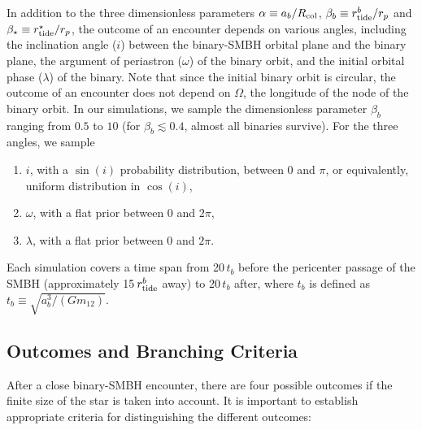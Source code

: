 \documentclass[twocolumn]{aastex631}
\begin{document}
In addition to the three dimensionless parameters $\alpha \equiv a_b/R_{\rm col}$, $\beta_b \equiv r_{\rm tide}^b/r_p$ and $\beta_\star \equiv r_{\rm tide}^\star/r_p$, the outcome of an encounter depends on various angles, including the inclination angle ($i$) between the binary-SMBH orbital plane and the binary plane, the argument of periastron ($\omega$) of the binary orbit, and the initial orbital phase ($\lambda$) of the binary. 
Note that since the initial binary orbit is circular, the outcome of an encounter does not depend on $\Omega$, the longitude of the node of the binary orbit. 
In our simulations, we sample the dimensionless parameter $\beta_b$ ranging from $0.5$ to $10$ (for $\beta_b \lesssim 0.4$, almost all binaries survive). 
For the three angles, we sample
\begin{enumerate}
    \item $i$, with a $\sin (i)$ probability distribution, between 0 and $\pi$, or equivalently, uniform distribution in $\cos (i)$,
    \item $\omega$, with a flat prior between 0 and $2\pi$,
    \item $\lambda$, with a flat prior between 0 and $2\pi$.
\end{enumerate}
Each simulation covers a time span from 20\,$t_b$ before the pericenter passage of the SMBH (approximately 15\,$r_{\rm tide}^b$ away) to 20\,$t_b$ after, where $t_b$ is defined as $t_b \equiv \sqrt{a_b^3/(Gm_{12})}$. 


\subsection{Outcomes and Branching Criteria}
\label{sec:outcomes and branching criteria}

After a close binary-SMBH encounter, there are four possible outcomes if the finite size of the star is taken into account.
It is important to establish appropriate criteria for distinguishing the different outcomes: 
\end{document}
